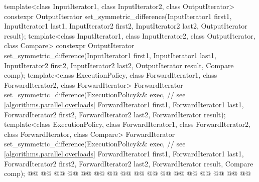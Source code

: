 \begin{codeblock}
{  template<class InputIterator1, class InputIterator2, class OutputIterator>
    constexpr OutputIterator
      set_symmetric_difference(InputIterator1 first1, InputIterator1 last1,
                               InputIterator2 first2, InputIterator2 last2,
                               OutputIterator result);
  template<class InputIterator1, class InputIterator2, class OutputIterator, class Compare>
    constexpr OutputIterator
      set_symmetric_difference(InputIterator1 first1, InputIterator1 last1,
                               InputIterator2 first2, InputIterator2 last2,
                               OutputIterator result, Compare comp);
  template<class ExecutionPolicy, class ForwardIterator1, class ForwardIterator2,
           class ForwardIterator>
    ForwardIterator
      set_symmetric_difference(ExecutionPolicy&& exec, // see \ref{algorithms.parallel.overloads}
                               ForwardIterator1 first1, ForwardIterator1 last1,
                               ForwardIterator2 first2, ForwardIterator2 last2,
                               ForwardIterator result);
  template<class ExecutionPolicy, class ForwardIterator1, class ForwardIterator2,
           class ForwardIterator, class Compare>
    ForwardIterator
      set_symmetric_difference(ExecutionPolicy&& exec, // see \ref{algorithms.parallel.overloads}
                               ForwardIterator1 first1, ForwardIterator1 last1,
                               ForwardIterator2 first2, ForwardIterator2 last2,
                               ForwardIterator result, Compare comp);
  @@
    @@
        @@
      @@
      @@
        @@
                                 @@
                                 @@
    @@
        @@
      @@
      @@
                   @@
                   @@
        @@
                                 @@
  @\added{\}}@

}
\end{codeblock}
